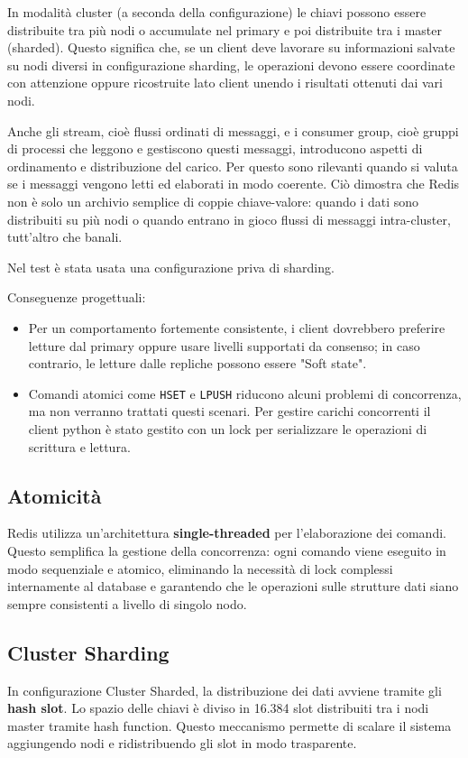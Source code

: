 \documentclass{article}
\begin{document}
In modalità cluster (a seconda della configurazione) 
le chiavi possono essere distribuite tra più nodi o accumulate nel primary e poi %
distribuite tra i master (sharded).
Questo significa che, se un client deve lavorare su informazioni salvate su nodi %
diversi in configurazione sharding, %
le operazioni devono essere coordinate con attenzione oppure ricostruite lato client %
unendo i risultati ottenuti dai vari nodi. 

Anche gli stream, cioè flussi ordinati di messaggi, e i consumer group, cioè gruppi %
di processi che leggono e gestiscono %
questi messaggi, introducono aspetti di ordinamento e distribuzione del carico. 
Per questo sono rilevanti quando si valuta se i messaggi vengono letti ed elaborati %
in modo coerente.
Ciò dimostra che Redis non è solo un archivio semplice di coppie chiave-valore: %
quando i dati sono distribuiti su più nodi o quando entrano in gioco flussi di messaggi %
intra-cluster, %
tutt'altro che banali.

Nel test è stata usata una configurazione priva di sharding.

Conseguenze progettuali:
\begin{itemize}
    \item Per un comportamento fortemente consistente, i client dovrebbero %
preferire letture dal %
primary oppure usare livelli supportati da consenso; in caso contrario, le %
letture dalle %
repliche possono essere "Soft state".
    \item Comandi atomici come \texttt{HSET} e \texttt{LPUSH} riducono alcuni %
problemi di %
concorrenza, ma non verranno trattati questi scenari. Per gestire carichi %
concorrenti il client python è stato gestito %
con un lock per serializzare le operazioni di scrittura e lettura.
\end{itemize}


\subsection{Atomicità}
Redis utilizza un'architettura \textbf{single-threaded} per l'elaborazione dei comandi. Questo semplifica la gestione %
della concorrenza: ogni comando viene eseguito in modo sequenziale e atomico, eliminando la necessità di lock complessi %
internamente al database e garantendo che le operazioni sulle strutture dati siano sempre consistenti a livello di singolo nodo.


\subsection{Cluster Sharding}
In configurazione Cluster Sharded, la distribuzione dei dati avviene tramite %
gli \textbf{hash slot}. Lo spazio delle chiavi è diviso in 16.384 slot %
distribuiti tra i nodi master tramite hash function. %
Questo meccanismo permette di scalare il sistema aggiungendo nodi e %
ridistribuendo gli slot in modo trasparente.
\end{document}
